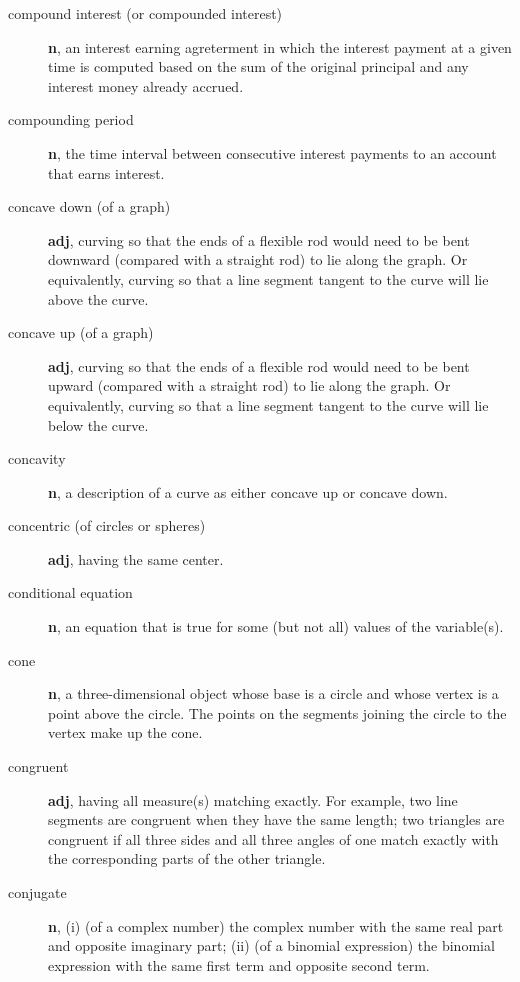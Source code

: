 \documentclass[10pt,]{book}
\newcommand{\terminology}[1]{\textbf{#1}}
\theoremstyle{plain}
\theoremstyle{definition}
\theoremstyle{definition}
\theoremstyle{definition}
\numberwithin{equation}{part}
\begin{document}
\begin{description}
\item[{compound interest (or compounded interest)}]\hypertarget{li-504}{}\terminology{n}, an interest earning agreterment in which the interest payment at a given time is computed based on the sum of the original principal and any interest money already accrued.%
\item[{compounding period}]\hypertarget{li-505}{}\terminology{n}, the time interval between consecutive interest payments to an account that earns interest.%
\item[{concave down (of a graph)}]\hypertarget{li-506}{}\terminology{adj}, curving so that the ends of a flexible rod would need to be bent downward (compared with a straight rod) to lie along the graph. Or equivalently, curving so that a line segment tangent to the curve will lie above the curve.%
\item[{concave up (of a graph)}]\hypertarget{li-507}{}\terminology{adj}, curving so that the ends of a flexible rod would need to be bent upward (compared with a straight rod) to lie along the graph. Or equivalently, curving so that a line segment tangent to the curve will lie below the curve.%
\item[{concavity}]\hypertarget{li-508}{}\terminology{n}, a description of a curve as either concave up or concave down.%
\item[{concentric (of circles or spheres)}]\hypertarget{li-509}{}\terminology{adj}, having the same center.%
\item[{conditional equation}]\hypertarget{li-510}{}\terminology{n}, an equation that is true for some (but not all) values of the variable(s).%
\item[{cone}]\hypertarget{li-511}{}\terminology{n}, a three-dimensional object whose base is a circle and whose vertex is a point above the circle. The points on the segments joining the circle to the vertex make up the cone.%
\item[{congruent}]\hypertarget{li-512}{}\terminology{adj}, having all measure(s) matching exactly. For example, two line segments are congruent when they have the same length; two triangles are congruent if all three sides and all three angles of one match exactly with the corresponding parts of the other triangle.%
\item[{conjugate}]\hypertarget{li-513}{}\terminology{n}, (i) (of a complex number) the complex number with the same real part and opposite imaginary part; (ii) (of a binomial expression) the binomial expression with the same first term and opposite second term.%

\end{description}
\end{document}

